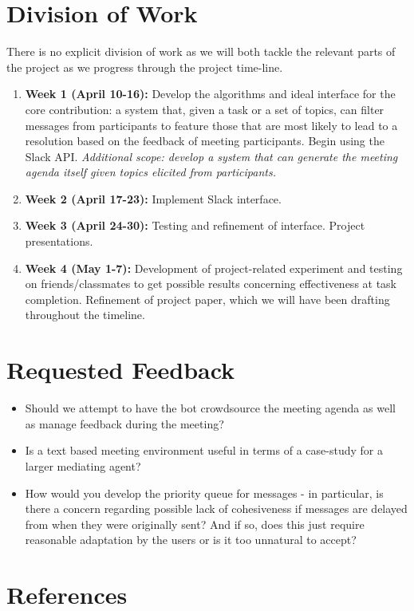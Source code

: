 \documentclass[final,authoryear,11pt,times]{elsarticle}
\begin{document}
\section{Division of Work}
	\label{sec:requestedfeedback}
	There is no explicit division of work as we will both tackle the relevant parts of the project as we progress through the project time-line. 
	\begin{enumerate}[noitemsep]
		\item{}\textbf{Week 1 (April 10-16):} Develop the algorithms and ideal interface for the core contribution: a system that, given a task or a set of topics, can filter messages from participants to feature those that are most likely to lead to a resolution based on the feedback of meeting participants. Begin using the Slack API. \textit{Additional scope: develop a system that can generate the meeting agenda itself given topics elicited from participants.}
		\item{}\textbf{Week 2 (April 17-23):} Implement Slack interface.
		\item{}\textbf{Week 3 (April 24-30):} Testing and refinement of interface. Project presentations.
		\item{}\textbf{Week 4 (May 1-7):} Development of project-related experiment and testing on friends/classmates to get possible results concerning effectiveness at task completion. Refinement of project paper, which we will have been drafting throughout the timeline.	
	\end{enumerate}

\section{Requested Feedback}
	\label{sec:requestedfeedback}
	\begin{itemize}[noitemsep]
		\item{}Should we attempt to have the bot crowdsource the meeting agenda as well as manage feedback during the meeting?
		\item{}Is a text based meeting environment useful in terms of a case-study for a larger mediating agent?
		\item{}How would you develop the priority queue for messages - in particular, is there a concern regarding possible lack of cohesiveness if messages are delayed from when they were originally sent? And if so, does this just require reasonable adaptation by the users or is it too unnatural to accept?
	\end{itemize}

\section{References}



\end{document}
